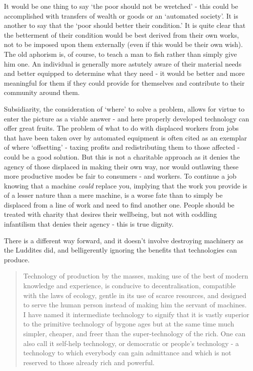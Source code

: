 \documentclass[letterpaper]{article}
\begin{document}
It would be one thing to say `the poor should not be wretched' - this could be accomplished with transfers of wealth or goods or an `automated society'. It is another to say that the `poor should better their condition.'  It is quite clear that the betterment of their condition would be best derived from their own works, not to be imposed upon them externally (even if this would be their own wish). The old aphorism is, of course, to teach a man to fish rather than simply give him one. An individual is generally more astutely aware of their material needs and better equipped to determine what they need - it would be better and more meaningful for them if they could provide for themselves and contribute to their community around them.

Subsidiarity, the consideration of `where' to solve a problem, allows for virtue to enter the picture as a viable answer - and here properly developed technology can offer great fruits. The problem of what to do with displaced workers from jobs that have been taken over by automated equipment is often cited as an exemplar of where `offsetting' - taxing profits and redistributing them to those affected - could be a good solution. But this is not a charitable approach as it denies the agency of those displaced in making their own way, nor would outlawing these more productive modes be fair to consumers - and workers. To continue a job knowing that a machine \textit{could} replace you, implying that the work you provide is of a lesser nature than a mere machine, is a worse fate than to simply be displaced from a line of work and need to find another one. People should be treated with charity that desires their wellbeing, but not with coddling infantilism that denies their agency - this is true dignity.

There is a different way forward, and it doesn't involve destroying machinery as the Luddites did, and belligerently ignoring the benefits that technologies can produce.

\begin{quote}
  Technology of production by the masses, making use of the best of modern knowledge and experience, is conducive to decentralisation, compatible with the laws of ecology, gentle in its use of scarce resources, and designed to serve the human person instead of making him the servant of machines. I have named it intermediate technology to signify that it is vastly superior to the primitive technology of bygone ages but at the same time much simpler, cheaper, and freer than the super-technology of the rich. One can also call it self-help technology, or democratic or people's technology - a technology to which everybody can gain admittance and which is not reserved to those already rich and powerful.
\end{quote}
\end{document}
